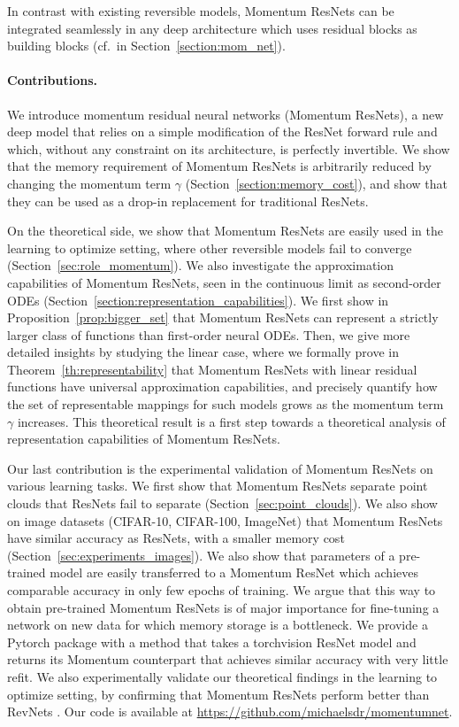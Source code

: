 \documentclass{article}
\begin{document}
In contrast with existing reversible models, Momentum ResNets can be integrated seamlessly in any deep architecture which uses residual blocks as building blocks (cf.\ in Section~\ref{section:mom_net}).
\vspace{-1em}
\paragraph{Contributions.}

We  introduce momentum residual neural networks (Momentum ResNets), a new deep model that relies on a simple modification of the ResNet forward rule and which, without any constraint on its architecture, is perfectly invertible. We show that the memory requirement of Momentum ResNets is arbitrarily reduced by changing the momentum term $\gamma$ (Section~\ref{section:memory_cost}), and show that they can be used as a drop-in replacement for traditional ResNets.

On the theoretical side,  we show that Momentum ResNets are easily used in the learning to optimize setting, where other reversible models fail to converge (Section~\ref{sec:role_momentum}). We also investigate the approximation capabilities of Momentum ResNets, seen in the continuous limit as second-order ODEs (Section~\ref{section:representation_capabilities}). We first show in Proposition~\ref{prop:bigger_set} that Momentum ResNets can represent a strictly larger class of functions than first-order neural ODEs. Then, we give more detailed insights by studying the linear case, where we formally prove in Theorem~\ref{th:representability} that Momentum ResNets with linear residual functions have universal approximation capabilities, and precisely quantify how the set of representable mappings for such models grows as the momentum term $\gamma$ increases. This theoretical result is a first step towards a theoretical analysis of representation capabilities of Momentum ResNets.
 
 Our last contribution is the experimental validation of Momentum ResNets on various learning tasks. We first show that Momentum ResNets separate point clouds that ResNets fail to separate (Section~\ref{sec:point_clouds}). We also show on image datasets (CIFAR-10, CIFAR-100, ImageNet) that Momentum ResNets have similar accuracy as ResNets, with a smaller memory cost (Section~\ref{sec:experiments_images}). We also show that parameters of a pre-trained model are easily transferred to a Momentum ResNet which achieves comparable accuracy in only few epochs of training. We argue that this way to obtain pre-trained Momentum ResNets is of major importance for fine-tuning a network on new data for which memory storage is a bottleneck.  We provide a Pytorch package with a method that takes a torchvision ResNet model and returns its Momentum counterpart that achieves similar accuracy with very little refit.  We also experimentally validate our theoretical findings in the learning to optimize setting, by confirming that Momentum ResNets perform better than RevNets \citep{gomez2017reversible}. 
 Our code is available at \url{https://github.com/michaelsdr/momentumnet}.
\end{document}
